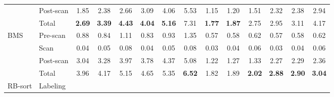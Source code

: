 \begin{table}
\begin{tabular}{p{\runtimefirstcol}lccc|ccc || ccc|ccc}
    & Post-scan 
        & 1.85 & 2.38 & 2.66 & 3.09 & 4.06 & 5.53 
        & 1.15 & 1.20 & 1.51 & 2.32 & 2.38 & 2.94 \\  
    & Total 
        & \textbf{2.69} & \textbf{3.39} & \textbf{4.43} & \textbf{4.04} & \textbf{5.16} & 7.31
        & \textbf{1.77} & \textbf{1.87} & 2.75 & 2.95 & 3.11 & 4.17 \\ 
	\midrule    
    \multirow{4}{*}{\parbox{\runtimefirstcol}{BMS}} 
    & Pre-scan 
        & 0.88 & 0.84 & 1.11 & 0.83 & 0.93 & 1.35  
        & 0.57 & 0.58 & 0.62 & 0.57 & 0.58 & 0.62 \\ 
    & Scan 
        & 0.04 & 0.05 & 0.08 & 0.04 & 0.05 & 0.08  
        & 0.03 & 0.04 & 0.06 & 0.03 & 0.04 & 0.06 \\  
    & Post-scan 
        & 3.04 & 3.28 & 3.97 & 3.78 & 4.37 & 5.08  
        & 1.22 & 1.27 & 1.33 & 2.27 & 2.29 & 2.36 \\  
    & Total 
        & 3.96 & 4.17 & 5.15 & 4.65 & 5.35 & \textbf{6.52}  
        & 1.82 & 1.89 & \textbf{2.02} & \textbf{2.88} & \textbf{2.90} & \textbf{3.04} \\ 
	\midrule    
    \multirow{4}{*}{\parbox{\runtimefirstcol}{RB-sort}} 
    & Labeling 

\end{tabular}
\end{table}
